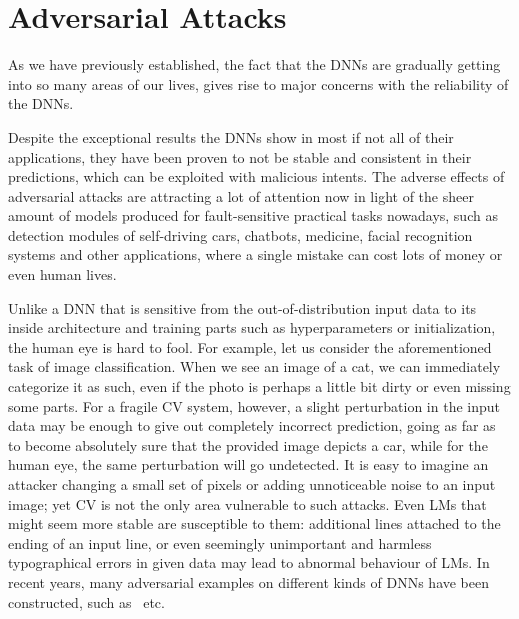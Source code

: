 
\section{Adversarial Attacks}

As we have previously established, the fact that the DNNs are gradually getting into so many areas of our lives, gives rise to major concerns with the reliability of the DNNs.

Despite the exceptional results the DNNs show in most if not all of their applications, they have been proven to not be stable and consistent in their predictions, which can be exploited with malicious intents.
The adverse effects of adversarial attacks are attracting a lot of attention now in light of the sheer amount of models produced for fault-sensitive practical tasks nowadays, such as detection modules of self-driving cars, chatbots, medicine, facial recognition systems and other applications, where a single mistake can cost lots of money or even human lives.

Unlike a DNN that is sensitive from the out-of-distribution input data to its inside architecture and training parts such as hyperparameters or initialization, the human eye is hard to fool.
For example, let us consider the aforementioned task of image classification.
When we see an image of a cat, we can immediately categorize it as such, even if the photo is perhaps a little bit dirty or even missing some parts.
For a fragile CV system, however, a slight perturbation in the input data may be enough to give out completely incorrect prediction, going as far as to become absolutely sure that the provided image depicts a car, while for the human eye, the same perturbation will go undetected.
It is easy to imagine an attacker changing a small set of pixels or adding unnoticeable noise to an input image; yet CV is not the only area vulnerable to such attacks. 
Even LMs that might seem more stable are susceptible to them: additional lines attached to the ending of an input line, or even seemingly unimportant and harmless typographical errors in given data may lead to abnormal behaviour of LMs. 
In recent years, many adversarial examples on different kinds of DNNs have been constructed, such as~\cite{first_adv, fgsm, pgd} etc.

